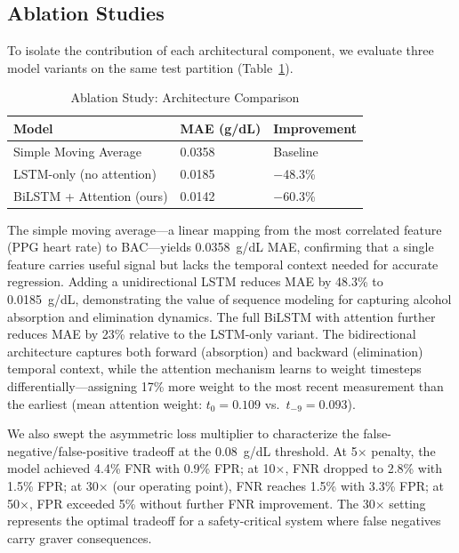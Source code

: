 \documentclass[HARVARD,Times2COL]{WileyNJDv5}
\begin{document}
\subsection{Ablation Studies}
To isolate the contribution of each architectural component, we evaluate three model variants on the same test partition (Table~\ref{tab:ablation}).

\begin{table}[htbp]
\caption{Ablation Study: Architecture Comparison}
\label{tab:ablation}
\centering
\small
\begin{tabular}{@{}lll@{}}
\toprule
\textbf{Model} & \textbf{MAE (g/dL)} & \textbf{Improvement} \\
\midrule
Simple Moving Average & 0.0358 & Baseline \\
LSTM-only (no attention) & 0.0185 & $-$48.3\% \\
BiLSTM + Attention (ours) & 0.0142 & $-$60.3\% \\
\bottomrule
\end{tabular}
\end{table}

The simple moving average---a linear mapping from the most correlated feature (PPG heart rate) to BAC---yields 0.0358~g/dL MAE, confirming that a single feature carries useful signal but lacks the temporal context needed for accurate regression. Adding a unidirectional LSTM reduces MAE by 48.3\% to 0.0185~g/dL, demonstrating the value of sequence modeling for capturing alcohol absorption and elimination dynamics. The full BiLSTM with attention further reduces MAE by 23\% relative to the LSTM-only variant. The bidirectional architecture captures both forward (absorption) and backward (elimination) temporal context, while the attention mechanism learns to weight timesteps differentially---assigning 17\% more weight to the most recent measurement than the earliest (mean attention weight: $t_0 = 0.109$ vs.\ $t_{-9} = 0.093$).

We also swept the asymmetric loss multiplier to characterize the false-negative/false-positive tradeoff at the 0.08~g/dL threshold. At 5$\times$ penalty, the model achieved 4.4\% FNR with 0.9\% FPR; at 10$\times$, FNR dropped to 2.8\% with 1.5\% FPR; at 30$\times$ (our operating point), FNR reaches 1.5\% with 3.3\% FPR; at 50$\times$, FPR exceeded 5\% without further FNR improvement. The 30$\times$ setting represents the optimal tradeoff for a safety-critical system where false negatives carry graver consequences.
\end{document}
